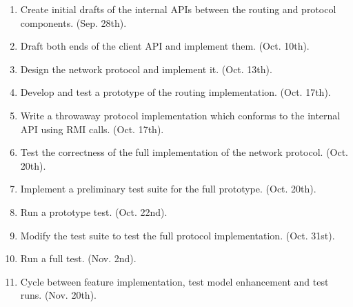 \documentclass{article}
\begin{document}
\begin{enumerate}

\item Create initial drafts of the internal APIs between the routing and
protocol components. (Sep. 28th).

\item Draft both ends of the client API and implement them. (Oct. 10th).

\item Design the network protocol and implement it. (Oct. 13th).

\item Develop and test a prototype of the routing
implementation. (Oct. 17th).

\item Write a throwaway protocol implementation which conforms to the
internal API using RMI calls. (Oct. 17th).

\item Test the correctness of the full implementation of the network
protocol. (Oct. 20th).

\item Implement a preliminary test suite for the full prototype.
(Oct. 20th).

\item Run a prototype test. (Oct. 22nd).

\item Modify the test suite to test the full protocol
implementation. (Oct. 31st).

\item Run a full test. (Nov. 2nd).

\item Cycle between feature implementation, test model enhancement
and test runs.  (Nov. 20th).

\end{enumerate}




\end{document}
